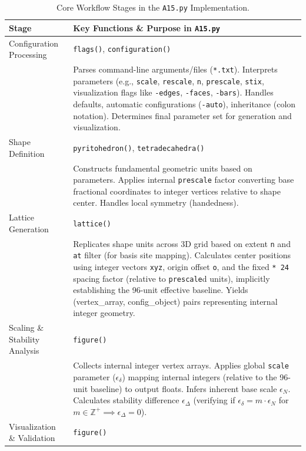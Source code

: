 \documentclass[10pt]{article}
\begin{document}
\begin{table}[!ht]
\centering
\caption{Core Workflow Stages in the \texttt{A15.py} Implementation.}
\label{tab-a15py-workflow}
\begin{tabularx}{\textwidth}{>{\raggedright\arraybackslash}p{} >{\raggedright\arraybackslash}X}
\toprule
\textbf{Stage} & \textbf{Key Functions \& Purpose in \texttt{A15.py}} \\
\midrule
Configuration Processing & \texttt{flags()}, \texttt{configuration()} \\
& Parses command-line arguments/files (\texttt{*.txt}). Interprets parameters (e.g., \texttt{scale}, \texttt{rescale}, \texttt{n}, \texttt{prescale}, \texttt{stix}, visualization flags like \texttt{-edges}, \texttt{-faces}, \texttt{-bars}). Handles defaults, automatic configurations (\texttt{-auto}), inheritance (colon notation). Determines final parameter set for generation and visualization. \\ \addlinespace
Shape Definition & \texttt{pyritohedron()}, \texttt{tetradecahedra()} \\
& Constructs fundamental geometric units based on parameters. Applies internal \texttt{prescale} factor converting base fractional coordinates to integer vertices relative to shape center. Handles local symmetry (handedness). \\ \addlinespace
Lattice Generation & \texttt{lattice()} \\
& Replicates shape units across 3D grid based on extent \texttt{n} and \texttt{at} filter (for basis site mapping). Calculates center positions using integer vectors \texttt{xyz}, origin offset \texttt{o}, and the fixed \texttt{* 24} spacing factor (relative to \texttt{prescale}d units), implicitly establishing the 96-unit effective baseline. Yields (vertex\_array, config\_object) pairs representing internal integer geometry. \\ \addlinespace
Scaling \& Stability Analysis & \texttt{figure()} \\
& Collects internal integer vertex arrays. Applies global \texttt{scale} parameter ($\epsilon_\delta$) mapping internal integers (relative to the 96-unit baseline) to output floats. Infers inherent base scale $\epsilon_N$. Calculates stability difference $\epsilon_\Delta$ (verifying if $\epsilon_\delta = m \cdot \epsilon_N$ for $m \in \mathbb{Z}^+ \implies \epsilon_\Delta=0$). \\ \addlinespace
Visualization \& Validation & \texttt{figure()} \\

\end{tabularx}
\end{table}
\end{document}
